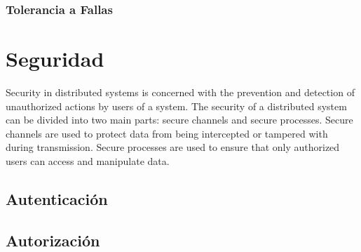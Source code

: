 \documentclass[10pt]{article} %
\begin{document}
	\subsubsection{Tolerancia a Fallas}
	
	\section{Seguridad}
	
	Security in distributed systems is concerned with the prevention and detection of unauthorized actions by users of a system. The security of a distributed system can be divided into two main parts: secure channels and secure processes. Secure channels are used to protect data from being intercepted or tampered with during transmission. Secure processes are used to ensure that only authorized users can access and manipulate data.
		
	\subsection{Autenticaci\'on}
	
	\subsection{Autorizaci\'on}
	
	 
\end{document}
